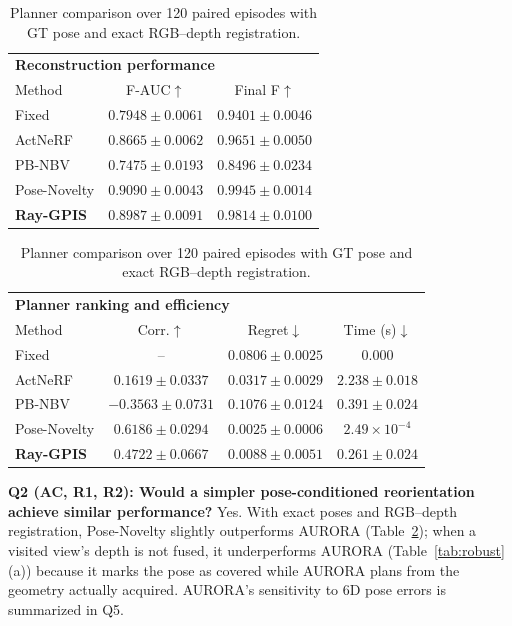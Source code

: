 \documentclass[conference]{IEEEtran}
\begin{document}
\begin{table}[t]
\centering
\caption{Planner comparison over 120 paired episodes with GT pose and exact
RGB--depth registration.}
\label{tab:planner}

\begin{tabularx}{\linewidth}{Xcc}
\toprule
\multicolumn{3}{l}{\textbf{Reconstruction performance}} \\
Method & F-AUC$\uparrow$ & Final F$\uparrow$ \\
\midrule
Fixed
  & $0.7948{\pm}0.0061$ & $0.9401{\pm}0.0046$ \\
ActNeRF~\cite{actnerf}
  & $0.8665{\pm}0.0062$ & $0.9651{\pm}0.0050$ \\
PB-NBV~\cite{pbnbv}
  & $0.7475{\pm}0.0193$ & $0.8496{\pm}0.0234$ \\
Pose-Novelty
  & $0.9090{\pm}0.0043$ & $0.9945{\pm}0.0014$ \\
\textbf{Ray-GPIS}
  & $\mathbf{0.8987{\pm}0.0091}$ & $\mathbf{0.9814{\pm}0.0100}$ \\
\bottomrule
\end{tabularx}

\begin{tabularx}{\linewidth}{Xccc}
\toprule
\multicolumn{4}{l}{\textbf{Planner ranking and efficiency}} \\
Method & Corr.$\uparrow$ & Regret$\downarrow$ & Time (s)$\downarrow$ \\
\midrule
Fixed
  & -- & $0.0806{\pm}0.0025$ & $0.000$ \\
Act\allowbreak NeRF
  & $0.1619{\pm}0.0337$
  & $0.0317{\pm}0.0029$
  & $2.238{\pm}0.018$ \\
PB-NBV
  & $-0.3563{\pm}0.0731$
  & $0.1076{\pm}0.0124$
  & $0.391{\pm}0.024$ \\
Pose-Novelty
  & $0.6186{\pm}0.0294$
  & $0.0025{\pm}0.0006$
  & $2.49{\times}10^{-4}$ \\
\textbf{Ray-GPIS}
  & $\mathbf{0.4722{\pm}0.0667}$
  & $\mathbf{0.0088{\pm}0.0051}$
  & $\mathbf{0.261{\pm}0.024}$ \\
\bottomrule
\end{tabularx}
\end{table}

\textbf{Q2 (AC, R1, R2): Would a simpler pose-conditioned reorientation
achieve similar performance?} Yes. With exact poses and RGB--depth registration,
Pose-Novelty slightly outperforms AURORA (Table~\ref{tab:planner}); when a
visited view's depth is not fused, it underperforms AURORA
(Table~\ref{tab:robust}(a)) because it marks the pose as covered while AURORA
plans from the geometry actually acquired. AURORA's sensitivity to 6D pose
errors is summarized in Q5.
\end{document}
